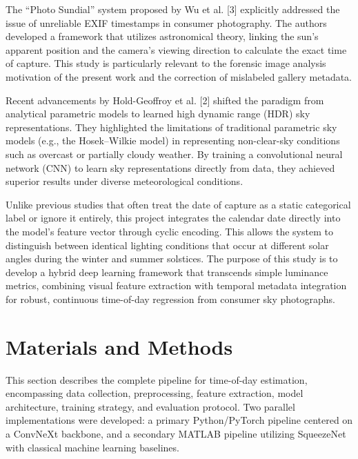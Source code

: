 \documentclass[9pt, a4paper, twocolumn]{article}
\begin{document}
The ``Photo Sundial'' system proposed by Wu et al. [3] explicitly addressed the issue of unreliable EXIF timestamps in consumer photography. The authors developed a framework that utilizes astronomical theory, linking the sun's apparent position and the camera's viewing direction to calculate the exact time of capture. This study is particularly relevant to the forensic image analysis motivation of the present work and the correction of mislabeled gallery metadata.

Recent advancements by Hold-Geoffroy et al. [2] shifted the paradigm from analytical parametric models to learned high dynamic range (HDR) sky representations. They highlighted the limitations of traditional parametric sky models (e.g., the Hosek--Wilkie model) in representing non-clear-sky conditions such as overcast or partially cloudy weather. By training a convolutional neural network (CNN) to learn sky representations directly from data, they achieved superior results under diverse meteorological conditions.

Unlike previous studies that often treat the date of capture as a static categorical label or ignore it entirely, this project integrates the calendar date directly into the model's feature vector through cyclic encoding. This allows the system to distinguish between identical lighting conditions that occur at different solar angles during the winter and summer solstices. The purpose of this study is to develop a hybrid deep learning framework that transcends simple luminance metrics, combining visual feature extraction with temporal metadata integration for robust, continuous time-of-day regression from consumer sky photographs.


\section{Materials and Methods}

This section describes the complete pipeline for time-of-day estimation, encompassing data collection, preprocessing, feature extraction, model architecture, training strategy, and evaluation protocol. Two parallel implementations were developed: a primary Python/PyTorch pipeline centered on a ConvNeXt backbone, and a secondary MATLAB pipeline utilizing SqueezeNet with classical machine learning baselines.
\end{document}
